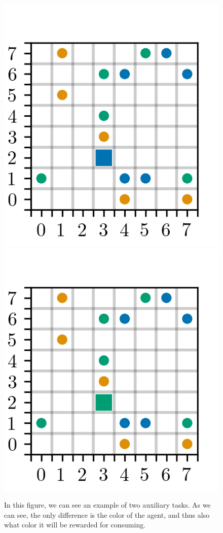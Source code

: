 \documentclass[12pt,A4]{report}
\theoremstyle{definition}
\begin{document}
\begin{figure}[H]
  \centering
  \includegraphics{"figures/aux_1.png"}
  \includegraphics{"figures/aux_2.png"}
  \caption{In this figure, we can see an example of two auxiliary tasks. As we can see, the only difference is the color of the agent, and thus also what color it will be rewarded for consuming.}
  \label{fig:aux_tasks}
\end{figure}
\end{document}
